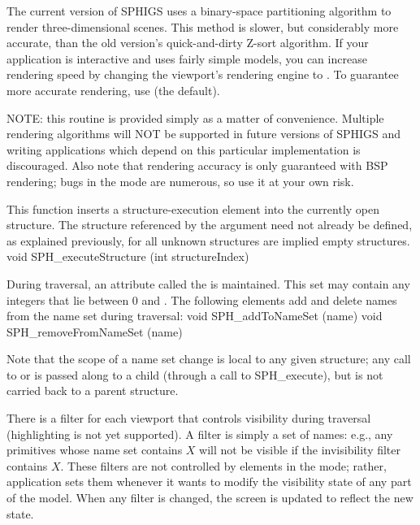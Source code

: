 \newpar
The current version of SPHIGS uses a binary-space partitioning
algorithm to render three-dimensional scenes.  This method is slower,
but considerably more accurate, than the old version's quick-and-dirty
Z-sort algorithm.  If your application is interactive and uses fairly simple
models, you can increase rendering speed by changing the viewport's rendering
engine to .  To guarantee more accurate rendering, use
 (the default).

\newpar
NOTE: this routine is provided simply as a matter of
convenience.  Multiple rendering algorithms will NOT be supported in
future versions of SPHIGS and writing applications which depend on
this particular implementation is discouraged.  Also note that
rendering accuracy is only guaranteed with BSP rendering; bugs in the
 mode are numerous, so use it at your own risk.


This function inserts a structure-execution element into the currently open
structure.  The structure referenced by the argument need not already be
defined, as explained previously, for all unknown structures are implied empty
structures.
\begincode
void SPH_executeStructure (int structureIndex) \elementgenerator
\endcode




During traversal, an attribute called the  is maintained.  This
set may contain any integers that lie between 0 and .  The
following elements add and delete names from the name set during traversal:
\begincode
void SPH_addToNameSet (name) \elementgenerator      {}
void SPH_removeFromNameSet (name) \elementgenerator {}
\endcode

\newpar
Note that the scope of a name set change is local to any given
structure; any call to  or
 is passed along to a child (through a
call to SPH\_execute), but is not carried back to a parent structure.

\newpar
There is a filter for each viewport that controls visibility during
traversal (highlighting is not yet supported).  A filter is simply a
set of names: e.g., any primitives whose name set contains $X$ will
not be visible if the invisibility filter contains $X$.  These filters
are not controlled by elements in the mode; rather, application sets
them whenever it wants to modify the visibility state of any part of
the model.  When any filter is changed, the screen is updated to
reflect the new state.

